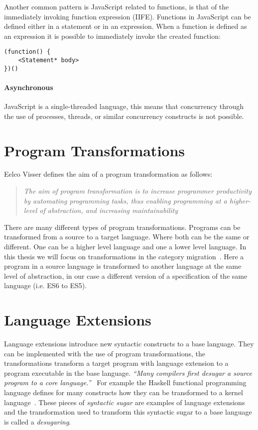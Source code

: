Another common pattern is JavaScript related to functions, is that of the immediately invoking function expression (IIFE). Functions in JavaScript can be defined either in a statement or in an expression. When a function is defined as an expression it is possible to immediately invoke the created function:

\begin{lstlisting}[title=IIFE,caption={Immediately invoking function expression}]
(function() {
	<Statement* body>
})()
\end{lstlisting}

\paragraph{Asynchronous}
JavaScript is a single-threaded language, this means that concurrency through the use of processes, threads, or similar concurrency constructs is not possible.

\section{Program Transformations}
Eelco Visser defines the aim of a program transformation as follows:

\blockquote[\cite{Visser2001}]{\textit{The aim of program transformation is to increase programmer productivity by automating programming tasks, thus enabling programming at a higher-level of abstraction, and increasing maintainability}}

There are many different types of program transformations. Programs can be transformed from a source to a target language. Where both can be the same or different. One can be a higher level language and one a lower level language. In this thesis we will focus on transformations in the category migration~\cite{Visser2001}. Here a program in a source language is transformed to another language at the same level of abstraction, in our case a different version of a specification of the same language (i.e. ES6 to ES5).

\section{Language Extensions} \label{lang-ext}
Language extensions introduce new syntactic constructs to a base language. They can be implemented with the use of program transformations, the transformations transform a target program with language extension to a program executable in the base language. \textit{``Many compilers first desugar a source program to a core language.''}~\cite{Erdweg2014} For example the Haskell functional programming language defines for many constructs how they can be transformed to a kernel language~\cite{PeytonJones}. These pieces of \textit{syntactic sugar} are examples of language extensions and the transformation used to transform this syntactic sugar to a base language is called a \textit{desugaring}.

